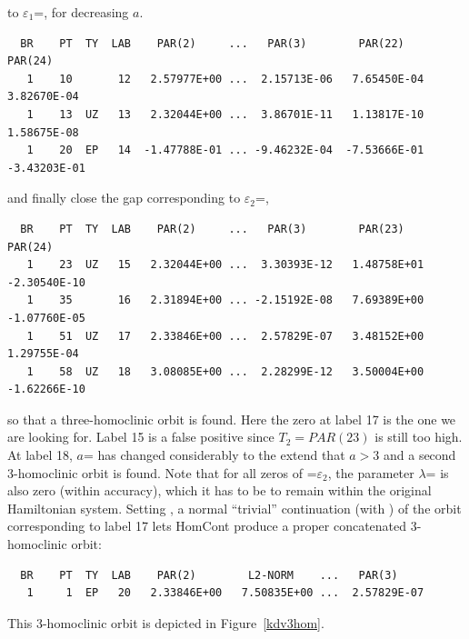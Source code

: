 \documentclass[12pt]{report}
\begin{document}
to $\varepsilon_1$=, for decreasing $a$.
\begin{center}
\end{center}
\begin{verbatim}
  BR    PT  TY  LAB    PAR(2)     ...   PAR(3)        PAR(22)       PAR(24)
   1    10       12   2.57977E+00 ...  2.15713E-06   7.65450E-04   3.82670E-04
   1    13  UZ   13   2.32044E+00 ...  3.86701E-11   1.13817E-10   1.58675E-08
   1    20  EP   14  -1.47788E-01 ... -9.46232E-04  -7.53666E-01  -3.43203E-01
\end{verbatim}
and finally close the gap corresponding to $\varepsilon_2$=,
\begin{center}
\end{center}
\begin{verbatim}
  BR    PT  TY  LAB    PAR(2)     ...   PAR(3)        PAR(23)       PAR(24)
   1    23  UZ   15   2.32044E+00 ...  3.30393E-12   1.48758E+01  -2.30540E-10
   1    35       16   2.31894E+00 ... -2.15192E-08   7.69389E+00  -1.07760E-05
   1    51  UZ   17   2.33846E+00 ...  2.57829E-07   3.48152E+00   1.29755E-04
   1    58  UZ   18   3.08085E+00 ...  2.28299E-12   3.50004E+00  -1.62266E-10
\end{verbatim}
so that a three-homoclinic orbit is found. Here the zero at label
17 is the one we are looking for. Label 15 is a false positive since
$T_2=PAR(23)$ is still too high. At label 18, $a$= 
has changed
considerably to the extend that $a>3$ and a second 3-homoclinic orbit 
is found. Note that for all zeros of =$\varepsilon_2$, the
parameter $\lambda$= is also zero (within \AUTO accuracy), 
which it has to be to remain
within the original Hamiltonian system.
Setting , a normal ``trivial'' continuation (with )
of the orbit corresponding to label 17
lets {\cal HomCont} produce a proper concatenated
3-homoclinic orbit:
\begin{center}
\end{center}
\begin{verbatim}
  BR    PT  TY  LAB    PAR(2)        L2-NORM    ...   PAR(3)     
   1     1  EP   20   2.33846E+00   7.50835E+00 ...  2.57829E-07
\end{verbatim}
This 3-homoclinic orbit is depicted in Figure~\ref{kdv3hom}.
\end{document}
